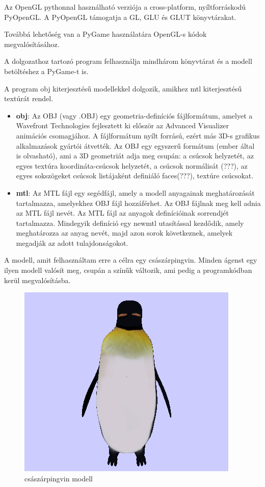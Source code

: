 Az OpenGL pythonnal használható verziója a cross-platform, nyíltforráskodú PyOpenGL. A PyOpenGL támogatja a GL, GLU és GLUT könyvtárakat.

Továbbá lehetőség van a PyGame használatára OpenGL-s kódok megvalósításához.

A dolgozathoz tartozó program felhasználja mindhárom könyvtárat és a modell betöltéshez a PyGame-t is.


A program obj kiterjesztésű modellekkel dolgozik, amikhez mtl kiterjesztésű textúrát rendel.
\begin{itemize}
\item {\bf obj}: Az OBJ (vagy .OBJ) egy geometria-definíciós fájlformátum, amelyet a Wavefront Technologies fejlesztett ki először az Advanced Visualizer animációs csomagjához. A fájlformátum nyílt forrású, ezért más 3D-s grafikus alkalmazások gyártói átvették.
Az OBJ egy egyszerű formátum (ember által is olvasható), ami a 3D geometriát adja meg csupán: a csúcsok helyzetét, az egyes textúra koordináta-csúcsok helyzetét, a csúcsok normálisát (???), az egyes sokszögeket csúcsok listájaként definiáló faces(???), textúre csúcsokat.
\item {\bf mtl}: Az MTL fájl egy segédfájl, amely a modell anyagainak meghatározását tartalmazza, amelyekhez OBJ fájl hozzáférhet. Az OBJ fájlnak meg kell adnia az MTL fájl nevét. Az MTL fájl az anyagok definícióinak sorrendjét tartalmazza. Mindegyik definíció egy newmtl utasítással kezdődik, amely meghatározza az anyag nevét, majd azon sorok következnek, amelyek megadják az adott tulajdonságokot.
\end{itemize}

A modell, amit felhasználtam erre a célra egy császárpingvin.
Minden ágenst egy ilyen modell valósít meg, csupán a színűk változik, ami pedig a programkódban kerül megvalósításba.

\begin{figure}[htp]
    \centering
   	\includegraphics[width=4truecm, height=3truecm]{images/pingvin.png}
	\caption{császárpingvin modell}
\end{figure}

